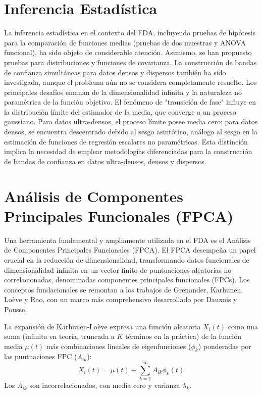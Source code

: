 \documentclass{article}
\begin{document}
\section*{\large Inferencia Estadística}
La inferencia estadística en el contexto del FDA, incluyendo pruebas de hipótesis para la comparación de funciones medias (pruebas de dos muestras y ANOVA funcional), ha sido objeto de considerable atención. Asimismo, se han propuesto pruebas para distribuciones y funciones de covarianza. La construcción de bandas de confianza simultáneas para datos densos y dispersos también ha sido investigada, aunque el problema aún no se considera completamente resuelto. Los principales desafíos emanan de la dimensionalidad infinita y la naturaleza no paramétrica de la función objetivo. El fenómeno de "transición de fase" influye en la distribución límite del estimador de la media, que converge a un proceso gaussiano. Para datos ultra-densos, el proceso límite posee media cero; para datos densos, se encuentra descentrado debido al sesgo asintótico, análogo al sesgo en la estimación de funciones de regresión escalares no paramétricas. Esta distinción implica la necesidad de emplear metodologías diferenciadas para la construcción de bandas de confianza en datos ultra-densos, densos y dispersos.

\section*{\large Análisis de Componentes Principales Funcionales (FPCA)}
Una herramienta fundamental y ampliamente utilizada en el FDA es el Análisis de Componentes Principales Funcionales (FPCA). El FPCA desempeña un papel crucial en la reducción de dimensionalidad, transformando datos funcionales de dimensionalidad infinita en un vector finito de puntuaciones aleatorias no correlacionadas, denominadas componentes principales funcionales (FPCs). Los conceptos fundacionales se remontan a los trabajos de Grenander, Karhunen, Loève y Rao, con un marco más comprehensivo desarrollado por Dauxois y Pousse.

\vspace{0.35cm}\noindent
La expansión de Karhunen-Loève expresa una función aleatoria $X_i(t)$ como una suma (infinita en teoría, truncada a $K$ términos en la práctica) de la función media $\mu(t)$ más combinaciones lineales de eigenfunciones ($\phi_k$) ponderadas por las puntuaciones FPC ($A_{ik}$):
$$X_i(t) = \mu(t) + \sum_{k=1}^{\infty} A_{ik} \phi_k(t)$$
Los $A_{ik}$ son incorrelacionados, con media cero y varianza $\lambda_k$.
\end{document}
